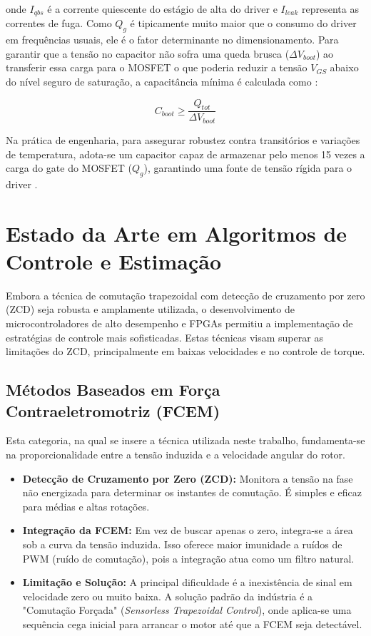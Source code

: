 \documentclass[12pt, a4paper, openright, oneside, brazilian]{abntex2}
\begin{document}
\noindent onde $I_{qbs}$ é a corrente quiescente do estágio de alta do driver e $I_{leak}$ representa as correntes de fuga. Como $Q_g$ é tipicamente muito maior que o consumo do driver em frequências usuais, ele é o fator determinante no dimensionamento. Para garantir que a tensão no capacitor não sofra uma queda brusca ($\Delta V_{boot}$) ao transferir essa carga para o MOSFET o que poderia reduzir a tensão $V_{GS}$ abaixo do nível seguro de saturação, a capacitância mínima é calculada como \cite{infineonAN978}:

\begin{equation}
    C_{boot} \geq \frac{Q_{tot}}{\Delta V_{boot}}
\end{equation}

Na prática de engenharia, para assegurar robustez contra transitórios e variações de temperatura, adota-se um capacitor capaz de armazenar pelo menos 15 vezes a carga do gate do MOSFET ($Q_g$), garantindo uma fonte de tensão rígida para o driver \cite{adamsDT98}.

\section{Estado da Arte em Algoritmos de Controle e Estimação}
\label{sec:estado_da_arte}

Embora a técnica de comutação trapezoidal com detecção de cruzamento por zero (ZCD) seja robusta e amplamente utilizada, o desenvolvimento de microcontroladores de alto desempenho e FPGAs permitiu a implementação de estratégias de controle mais sofisticadas. Estas técnicas visam superar as limitações do ZCD, principalmente em baixas velocidades e no controle de torque.

\subsection{Métodos Baseados em Força Contraeletromotriz (FCEM)}
Esta categoria, na qual se insere a técnica utilizada neste trabalho, fundamenta-se na proporcionalidade entre a tensão induzida e a velocidade angular do rotor.
\begin{itemize}
    \item \textbf{Detecção de Cruzamento por Zero (ZCD):} Monitora a tensão na fase não energizada para determinar os instantes de comutação. É simples e eficaz para médias e altas rotações.
    \item \textbf{Integração da FCEM:} Em vez de buscar apenas o zero, integra-se a área sob a curva da tensão induzida. Isso oferece maior imunidade a ruídos de PWM (ruído de comutação), pois a integração atua como um filtro natural.
    \item \textbf{Limitação e Solução:} A principal dificuldade é a inexistência de sinal em velocidade zero ou muito baixa. A solução padrão da indústria é a "Comutação Forçada" (\textit{Sensorless Trapezoidal Control}), onde aplica-se uma sequência cega inicial para arrancar o motor até que a FCEM seja detectável.
\end{itemize}
\end{document}
